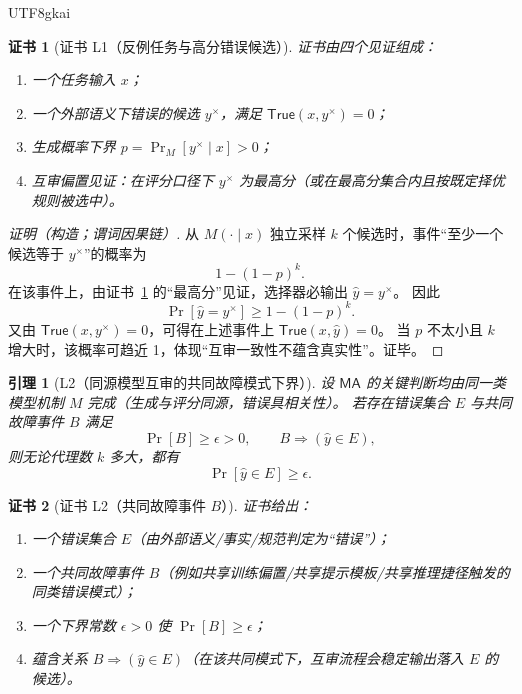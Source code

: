 \documentclass[12pt]{article}
\newtheorem{lemma}{引理}[section]
\newtheorem{Certificate}{证书}[section]
\begin{document}
\begin{CJK*}{UTF8}{gkai}
\begin{Certificate}[证书 L1（反例任务与高分错误候选）]
\label{cert:tex27-ch17-l1}
证书由四个见证组成：
\begin{enumerate}
  \item 一个任务输入 $x$；
  \item 一个外部语义下错误的候选 $y^{\times}$，满足 $\mathsf{True}(x,y^{\times})=0$；
  \item 生成概率下界 $p=\Pr_{M}[y^{\times}\mid x]>0$；
  \item 互审偏置见证：在评分口径下 $y^{\times}$ 为最高分（或在最高分集合内且按既定择优规则被选中）。
\end{enumerate}
\end{Certificate}

\begin{proof}[证明（构造；谓词因果链）]
从 $M(\cdot\mid x)$ 独立采样 $k$ 个候选时，事件“至少一个候选等于 $y^{\times}$”的概率为
\[
  1-(1-p)^k.
\]
在该事件上，由证书~\ref{cert:tex27-ch17-l1} 的“最高分”见证，选择器必输出 $\hat y=y^{\times}$。
因此
\[
  \Pr[\hat y=y^{\times}]\ge 1-(1-p)^k.
\]
又由 $\mathsf{True}(x,y^{\times})=0$，可得在上述事件上 $\mathsf{True}(x,\hat y)=0$。
当 $p$ 不太小且 $k$ 增大时，该概率可趋近 1，体现“互审一致性不蕴含真实性”。证毕。
\end{proof}

\begin{lemma}[L2（同源模型互审的共同故障模式下界）]
\label{lem:tex27-ch17-l2}
设 $\mathsf{MA}$ 的关键判断均由同一类模型机制 $M$ 完成（生成与评分同源，错误具相关性）。
若存在错误集合 $E$ 与共同故障事件 $B$ 满足
\[
  \Pr[B]\ge \epsilon>0,
  \qquad
  B\Rightarrow(\hat y\in E),
\]
则无论代理数 $k$ 多大，都有
\[
  \Pr[\hat y\in E]\ge \epsilon.
\]
\end{lemma}

\begin{Certificate}[证书 L2（共同故障事件 $B$）]
\label{cert:tex27-ch17-l2}
证书给出：
\begin{enumerate}
  \item 一个错误集合 $E$（由外部语义/事实/规范判定为“错误”）；
  \item 一个共同故障事件 $B$（例如共享训练偏置/共享提示模板/共享推理捷径触发的同类错误模式）；
  \item 一个下界常数 $\epsilon>0$ 使 $\Pr[B]\ge\epsilon$；
  \item 蕴含关系 $B\Rightarrow(\hat y\in E)$（在该共同模式下，互审流程会稳定输出落入 $E$ 的候选）。
\end{enumerate}
\end{Certificate}


\end{CJK*}
\end{document}
